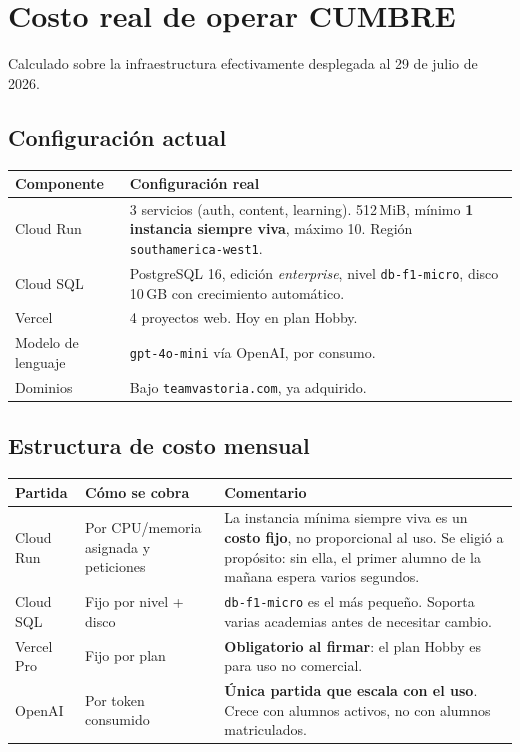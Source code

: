 \documentclass[11pt,a4paper]{article}
\begin{document}
\section{Costo real de operar CUMBRE}

Calculado sobre la infraestructura efectivamente desplegada al 29 de julio de
2026.

\subsection{Configuración actual}

\begin{longtable}{@{}p{4.2cm}p{10.4cm}@{}}
\toprule
\textbf{Componente} & \textbf{Configuración real} \\
\midrule
\endhead
Cloud Run & 3 servicios (auth, content, learning). 512\,MiB, mínimo
\textbf{1 instancia siempre viva}, máximo 10. Región
\texttt{southamerica-west1}. \\
\addlinespace
Cloud SQL & PostgreSQL 16, edición \emph{enterprise}, nivel
\texttt{db-f1-micro}, disco 10\,GB con crecimiento automático. \\
\addlinespace
Vercel & 4 proyectos web. Hoy en plan Hobby. \\
\addlinespace
Modelo de lenguaje & \texttt{gpt-4o-mini} vía OpenAI, por consumo. \\
\addlinespace
Dominios & Bajo \texttt{teamvastoria.com}, ya adquirido. \\
\bottomrule
\end{longtable}

\subsection{Estructura de costo mensual}

\begin{longtable}{@{}p{3.6cm}p{4.6cm}p{6.4cm}@{}}
\toprule
\textbf{Partida} & \textbf{Cómo se cobra} & \textbf{Comentario} \\
\midrule
\endhead
Cloud Run & Por CPU/memoria asignada y peticiones & La instancia mínima
siempre viva es un \textbf{costo fijo}, no proporcional al uso. Se eligió a
propósito: sin ella, el primer alumno de la mañana espera varios segundos. \\
\addlinespace
Cloud SQL & Fijo por nivel + disco & \texttt{db-f1-micro} es el más pequeño.
Soporta varias academias antes de necesitar cambio. \\
\addlinespace
Vercel Pro & Fijo por plan & \textbf{Obligatorio al firmar}: el plan Hobby es
para uso no comercial. \\
\addlinespace
OpenAI & Por token consumido & \textbf{Única partida que escala con el uso}.
Crece con alumnos activos, no con alumnos matriculados. \\
\bottomrule
\end{longtable}
\end{document}
